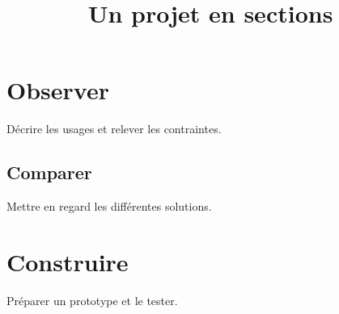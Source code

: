 \documentclass{article}
\title{Un projet en sections}
\begin{document}
\section{Observer}
Décrire les usages et relever les contraintes.
\subsection{Comparer}
Mettre en regard les différentes solutions.
\section{Construire}
Préparer un prototype et le tester.
\end{document}
